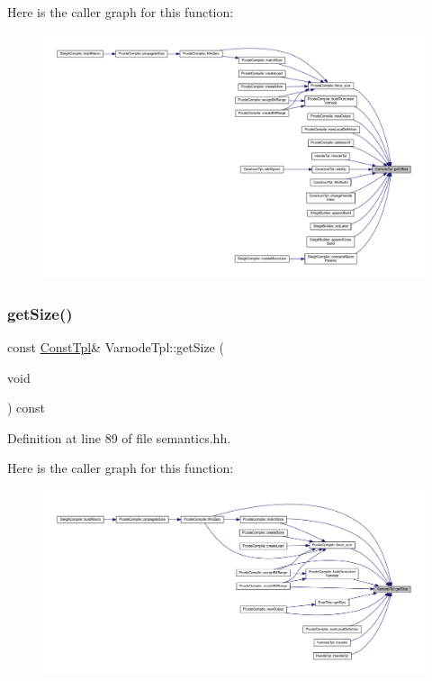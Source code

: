 Here is the caller graph for this function\+:
\nopagebreak
\begin{figure}[H]
\begin{center}
\leavevmode
\includegraphics[width=350pt]{class_varnode_tpl_a451245a703d57112521947df5336574d_icgraph}
\end{center}
\end{figure}
\mbox{\label{class_varnode_tpl_ad40485cfdd6a2e6bc2e2d62df26c664b}} 
\subsubsection{\texorpdfstring{getSize()}{getSize()}}
{\footnotesize\ttfamily const \mbox{\hyperlink{class_const_tpl}{Const\+Tpl}}\& Varnode\+Tpl\+::get\+Size (\begin{DoxyParamCaption}\item[{void}]{ }\end{DoxyParamCaption}) const\hspace{0.3cm}{\ttfamily [inline]}}



Definition at line 89 of file semantics.\+hh.

Here is the caller graph for this function\+:
\nopagebreak
\begin{figure}[H]
\begin{center}
\leavevmode
\includegraphics[width=350pt]{class_varnode_tpl_ad40485cfdd6a2e6bc2e2d62df26c664b_icgraph}
\end{center}
\end{figure}
\mbox{\label{class_varnode_tpl_a8e64fde8b1b76550d7bec9ad48cce669}} 
